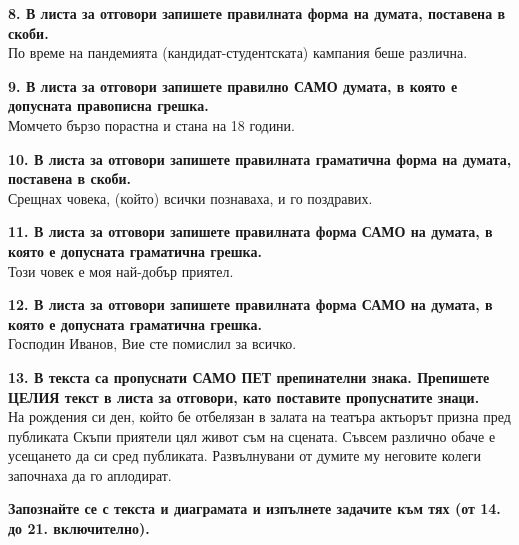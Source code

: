\documentclass[12pt,a4paper]{article}
\begin{document}
\vspace{0.6cm}

\noindent
\textbf{8. В листа за отговори запишете правилната форма на думата, поставена в скоби.} \\[0.3em]
\noindent
По време на пандемията (кандидат-студентската) кампания беше различна.

\vspace{0.6cm}

\noindent
\textbf{9. В листа за отговори запишете правилно САМО думата, в която е допусната правописна грешка.} \\[0.3em]
\noindent
Момчето бързо порастна и стана на 18 години.

\vspace{0.6cm}

\noindent
\textbf{10. В листа за отговори запишете правилната граматична форма на думата, поставена в скоби.} \\[0.3em]
\noindent
Срещнах човека, (който) всички познаваха, и го поздравих.

\vspace{0.6cm}

\noindent
\textbf{11. В листа за отговори запишете правилната форма САМО на думата, в която е допусната граматична грешка.} \\[0.3em]
\noindent
Този човек е моя най-добър приятел.

\vspace{0.6cm}

\noindent
\textbf{12. В листа за отговори запишете правилната форма САМО на думата, в която е допусната граматична грешка.} \\[0.3em]
\noindent
Господин Иванов, Вие сте помислил за всичко.

\vspace{0.6cm}

\noindent
\textbf{13. В текста са пропуснати САМО ПЕТ препинателни знака. Препишете ЦЕЛИЯ текст в листа за отговори, като поставите пропуснатите знаци.} \\[0.3em]
\noindent
На рождения си ден, който бе отбелязан в залата на театъра актьорът призна пред публиката Скъпи приятели цял живот съм на сцената. Съвсем различно обаче е усещането да си сред публиката. Развълнувани от думите му неговите колеги започнаха да го аплодират.

\vspace{0.6cm}

\noindent
\textbf{Запознайте се с текста и диаграмата и изпълнете задачите към тях (от 14. до 21. включително).}
\end{document}
